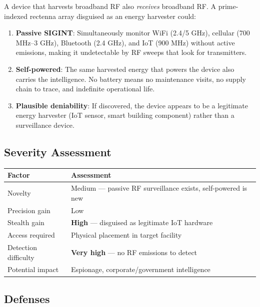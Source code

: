 \documentclass[11pt,a4paper]{article}
\begin{document}
A device that harvests broadband RF also \emph{receives} broadband
RF. A prime-indexed rectenna array disguised as an energy harvester
could:

\begin{enumerate}
  \item \textbf{Passive SIGINT}: Simultaneously monitor WiFi
    (2.4/5 GHz), cellular (700 MHz--3 GHz), Bluetooth (2.4 GHz),
    and IoT (900 MHz) without active emissions, making it
    undetectable by RF sweeps that look for transmitters.

  \item \textbf{Self-powered}: The same harvested energy that
    powers the device also carries the intelligence. No battery
    means no maintenance visits, no supply chain to trace, and
    indefinite operational life.

  \item \textbf{Plausible deniability}: If discovered, the device
    appears to be a legitimate energy harvester (IoT sensor, smart
    building component) rather than a surveillance device.
\end{enumerate}

\subsection{Severity Assessment}

\begin{center}
\begin{tabular}{@{}ll@{}}
\toprule
\textbf{Factor} & \textbf{Assessment} \\
\midrule
Novelty & Medium --- passive RF surveillance exists, self-powered is new \\
Precision gain & Low \\
Stealth gain & \textbf{High} --- disguised as legitimate IoT hardware \\
Access required & Physical placement in target facility \\
Detection difficulty & \textbf{Very high} --- no RF emissions to detect \\
Potential impact & Espionage, corporate/government intelligence \\
\bottomrule
\end{tabular}
\end{center}

\subsection{Defenses}
\end{document}
